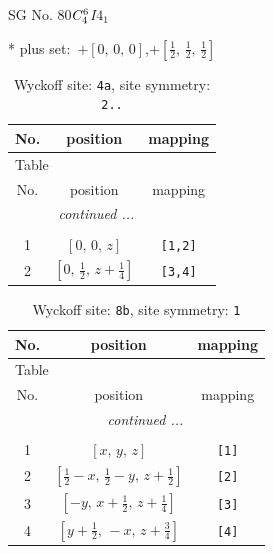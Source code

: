 \documentclass[fleqn,8pt]{jsarticle}
\begin{document}
\setcounter{MaxMatrixCols}{32}

\renewcommand{\tablename}{Table~}
\renewcommand{\figurename}{Figure~}
\begin{center}
\LARGE
SG No. 80\quad$C_{\rm 4}^{6}$\quad$I4_1$\quad[ tetragonal ]
\end{center}
* plus set:\,\,\,$+\left[ 0,\, 0,\, 0 \right]$,\quad $+\left[ \frac{1}{2},\, \frac{1}{2},\, \frac{1}{2} \right]$
\renewcommand{\arraystretch}{1.2}
\begin{longtable}{ccc}
\caption{Wyckoff site: {\tt 4a}, site symmetry: {\tt 2..}}
 \\
 \hline \hline
No. & position & mapping \\ \hline \endfirsthead

\multicolumn{2}{l}{\tablename\ \thetable{}} \\
 \hline \hline
No. & position & mapping \\ \hline \endhead

 \hline \hline
\multicolumn{2}{r}{\footnotesize\it continued ...} \\ \endfoot

 \hline \hline
\multicolumn{2}{r}{} \\ \endlastfoot

1 & $\left[ 0,\, 0,\, z \right]$ & {\tt [1,2]} \\ \hline
2 & $\left[ 0,\, \frac{1}{2},\, z + \frac{1}{4} \right]$ & {\tt [3,4]} \\
\end{longtable}
\renewcommand{\arraystretch}{1.2}
\begin{longtable}{ccc}
\caption{Wyckoff site: {\tt 8b}, site symmetry: {\tt 1}}
 \\
 \hline \hline
No. & position & mapping \\ \hline \endfirsthead

\multicolumn{2}{l}{\tablename\ \thetable{}} \\
 \hline \hline
No. & position & mapping \\ \hline \endhead

 \hline \hline
\multicolumn{2}{r}{\footnotesize\it continued ...} \\ \endfoot

 \hline \hline
\multicolumn{2}{r}{} \\ \endlastfoot

1 & $\left[ x,\, y,\, z \right]$ & {\tt [1]} \\ \hline
2 & $\left[ \frac{1}{2} - x,\, \frac{1}{2} - y,\, z + \frac{1}{2} \right]$ & {\tt [2]} \\ \hline
3 & $\left[ - y,\, x + \frac{1}{2},\, z + \frac{1}{4} \right]$ & {\tt [3]} \\ \hline
4 & $\left[ y + \frac{1}{2},\, - x,\, z + \frac{3}{4} \right]$ & {\tt [4]} \\
\end{longtable}
\end{document}
